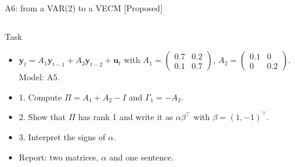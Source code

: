 \begin{frame}{A6: from a VAR(2) to a VECM [Proposed]}
\propsub
\itemsize{\scriptsize}
\begin{columns}[T]
\begin{column}{\taskw}
\begin{block}{Task}
\begin{itemize}
    \item $\mathbf y_t = A_1\mathbf y_{t-1} + A_2\mathbf y_{t-2} + \mathbf u_t$ with $A_1 = \begin{pmatrix} 0.7 & 0.2 \\ 0.1 & 0.7 \end{pmatrix}$, $A_2 = \begin{pmatrix} 0.1 & 0 \\ 0 & 0.2 \end{pmatrix}$. Model: A5.
    \item 1. Compute $\Pi = A_1 + A_2 - I$ and $\Gamma_1 = -A_2$.
    \item 2. Show that $\Pi$ has rank 1 and write it as $\alpha\beta^\top$ with $\beta = (1, -1)^\top$.
    \item 3. Interpret the signs of $\alpha$.
    \item Report: two matrices, $\alpha$ and one sentence.
\end{itemize}
\end{block}
\end{column}
\begin{column}{\solw}
\end{column}
\end{columns}
\end{frame}


